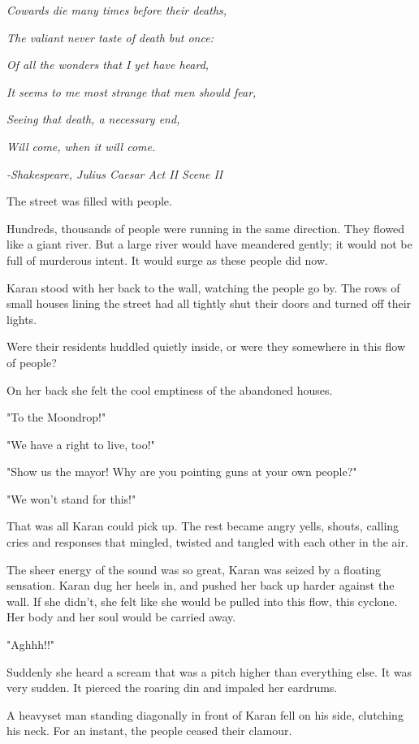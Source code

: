 \emph{Cowards die many times before their deaths,}

\emph{The valiant never taste of death but once:}

\emph{Of all the wonders that I yet have heard,}

\emph{It seems to me most strange that men should fear,}

\emph{Seeing that death, a necessary end,}

\emph{Will come, when it will come.}

\emph{-Shakespeare, Julius Caesar Act II Scene II~}

The street was filled with people.

Hundreds, thousands of people were running in the same direction. They
flowed like a giant river. But a large river would have meandered
gently; it would not be full of murderous intent. It would surge as
these people did now.

Karan stood with her back to the wall, watching the people go by. The
rows of small houses lining the street had all tightly shut their doors
and turned off their lights.

Were their residents huddled quietly inside, or were they somewhere in
this flow of people?

On her back she felt the cool emptiness of the abandoned houses.

"To the Moondrop!"

"We have a right to live, too!"

"Show us the mayor! Why are you pointing guns at your own people?"

"We won't stand for this!"

That was all Karan could pick up. The rest became angry yells, shouts,
calling cries and responses that mingled, twisted and tangled with each
other in the air.

The sheer energy of the sound was so great, Karan was seized by a
floating sensation. Karan dug her heels in, and pushed her back up
harder against the wall. If she didn't, she felt like she would be
pulled into this flow, this cyclone. Her body and her soul would be
carried away.

"Aghhh!!"

Suddenly she heard a scream that was a pitch higher than everything
else. It was very sudden. It pierced the roaring din and impaled her
eardrums.

A heavyset man standing diagonally in front of Karan fell on his side,
clutching his neck. For an instant, the people ceased their clamour.


